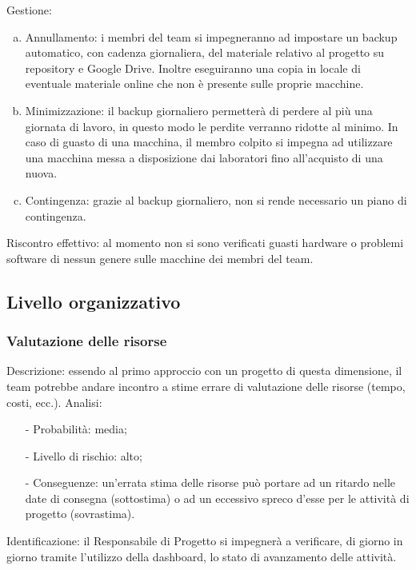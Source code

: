 \documentclass[../PianoProgetto.tex]{subfiles}
\begin{document}
	Gestione:
	\begin{enumerate}[(a)]
		\item Annullamento: i membri del team si impegneranno ad impostare un backup automatico, con cadenza giornaliera, del materiale relativo al progetto su 	repository e Google Drive. Inoltre eseguiranno una copia in locale di eventuale materiale online che non è presente sulle proprie macchine.
		\item Minimizzazione: il backup giornaliero permetterà di perdere al più una giornata di lavoro, in questo modo le perdite verranno ridotte al minimo. In caso di guasto di una macchina, il membro colpito si impegna ad utilizzare una macchina messa a disposizione dai laboratori fino all’acquisto di una nuova. 
		\item Contingenza: grazie al backup giornaliero, non si rende necessario un piano di contingenza.
	\end{enumerate} 	
	Riscontro effettivo: al momento non si sono verificati guasti hardware o problemi software di nessun genere sulle macchine dei membri del team.

\subsection{Livello organizzativo}

\subsubsection{Valutazione delle risorse}
	Descrizione: essendo al primo approccio con un progetto di questa dimensione, il team potrebbe andare incontro a stime errare di valutazione delle risorse (tempo, costi, ecc.).
	Analisi:
	\begin{itemize}
		\item[-] Probabilità: media;
		\item[-] Livello di rischio: alto;
		\item[-] Conseguenze: un’errata stima delle risorse può portare ad un ritardo nelle date di consegna (sottostima) o ad un eccessivo spreco d’esse per le attività di progetto (sovrastima).
	\end{itemize}
	Identificazione: il Responsabile di Progetto si impegnerà a verificare, di giorno in giorno tramite l’utilizzo della dashboard, lo stato di avanzamento delle attività.
	
\end{document}
